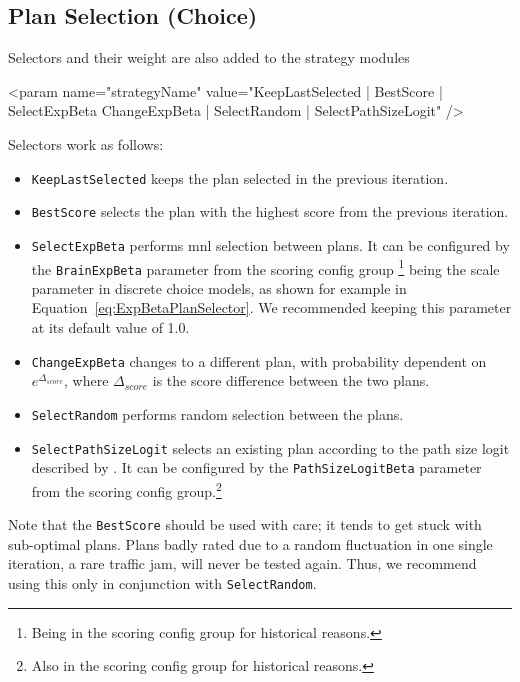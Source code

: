 \subsection{Plan Selection (Choice)}
\label{sec:selectors}
Selectors and their weight are also added to the strategy modules
%
\begin{xml}
	<param name="strategyName" value="KeepLastSelected | BestScore | SelectExpBeta
					ChangeExpBeta | SelectRandom | SelectPathSizeLogit" />
\end{xml}
%
Selectors work as follows:
%
\begin{itemize}\styleItemize
	\item \lstinline|KeepLastSelected| keeps the plan selected in the previous iteration.
	\item \lstinline|BestScore| selects the plan with the highest score from the previous iteration.
	\item \lstinline|SelectExpBeta| performs \gls{mnl} selection between plans. It can be configured by the \lstinline|BrainExpBeta| parameter from the scoring config group%
	\footnote{Being in the scoring config group for historical reasons. 
	}
	being the scale parameter in discrete choice models, as shown for example in Equation~\ref{eq:ExpBetaPlanSelector}. We recommended keeping this parameter at its default value of 1.0.
	\item \lstinline|ChangeExpBeta| changes to a different plan, with probability dependent on $e^{\Delta_{score}}$, where $\Delta_{score}$ is the score difference between the two plans.
	\item \lstinline|SelectRandom| performs random selection between the plans.
	\item \lstinline|SelectPathSizeLogit| selects an existing plan according to the path size logit described by \citet[][]{FrejingerBierlaire_TransResB_2007}. It can be configured by the \lstinline|PathSizeLogitBeta| parameter from the scoring config group.\footnote{Also in the scoring config group for historical reasons.}
\end{itemize}
%
Note that the \lstinline|BestScore| should be used with care; it tends to get stuck with sub-optimal plans. Plans badly rated due to a random fluctuation in one single iteration, \eg a rare traffic jam, will never be tested again. Thus, we recommend using this only in conjunction with \lstinline|SelectRandom|.

